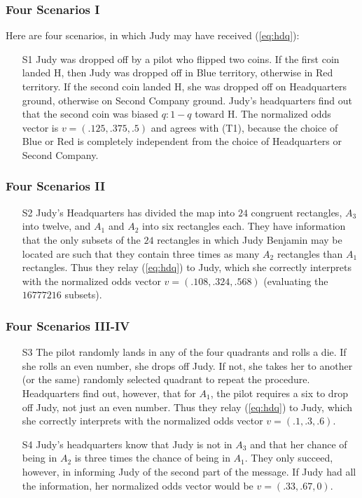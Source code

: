 \documentclass[xcolor=dvipsnames]{beamer}
\begin{document}
\begin{frame}
  \frametitle{Four Scenarios I}
  Here are four scenarios, in which Judy may have received
  ({\ref{eq:hdq}}):
\begin{enumerate}
\item[S1] Judy was dropped off by a pilot who flipped two coins. If
  the first coin landed H, then Judy was dropped off in Blue
  territory, otherwise in Red territory. If the second coin landed H,
  she was dropped off on Headquarters ground, otherwise on Second
  Company ground. Judy's headquarters find out that the second coin
  was biased $q:1-q$ toward H. The normalized odds vector is
  $v=(.125,.375,.5)$ and agrees with (T1), because the choice of Blue
  or Red is completely independent from the choice of Headquarters or
  Second Company.
\end{enumerate}
\end{frame}

\begin{frame}
  \frametitle{Four Scenarios II}
\begin{enumerate}
\item [S2] Judy's Headquarters has divided the map into $24$ congruent
  rectangles, $A_{3}$ into twelve, and $A_{1}$ and $A_{2}$ into six
  rectangles each. They have information that the only subsets of the
  $24$ rectangles in which Judy Benjamin may be located are such that
  they contain three times as many $A_{2}$ rectangles than $A_{1}$
  rectangles. Thus they relay ({\ref{eq:hdq}}) to Judy, which she
  correctly interprets with the normalized odds vector
  $v=(.108,.324,.568)$ (evaluating the $16777216$ subsets).
\end{enumerate}
\end{frame}

\begin{frame}
  \frametitle{Four Scenarios III-IV}
\begin{enumerate}
\item[S3] The pilot randomly lands in any of the four quadrants and
  rolls a die. If she rolls an even number, she drops off Judy. If
  not, she takes her to another (or the same) randomly selected
  quadrant to repeat the procedure. Headquarters find out, however,
  that for $A_{1}$, the pilot requires a six to drop off Judy, not
  just an even number. Thus they relay ({\ref{eq:hdq}}) to Judy, which
  she correctly interprets with the normalized odds vector
  $v=(.1,.3,.6)$.
\item [S4] Judy's headquarters know that Judy is not in $A_{3}$ and
  that her chance of being in $A_{2}$ is three times the chance of
  being in $A_{1}$. They only succeed, however, in informing Judy of
  the second part of the message. If Judy had all the information, her
  normalized odds vector would be $v=(.33,.67,0)$.
\end{enumerate}
\end{frame}
\end{document}
